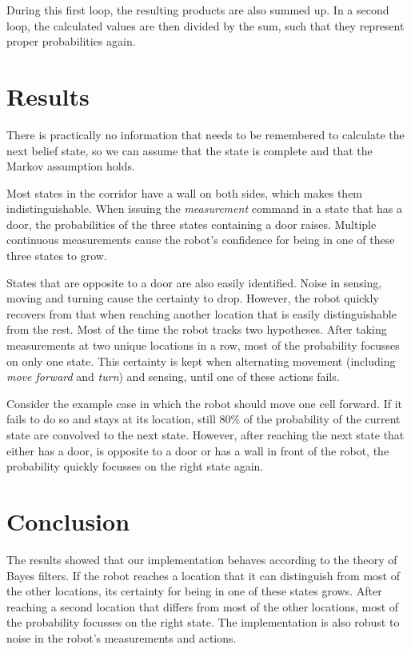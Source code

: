 \documentclass[10pt,a4paper]{article}
\begin{document}
		During this first loop, the resulting products are also summed up. In a second loop, the calculated values are then divided by the sum, such that they represent proper probabilities again.
	
	\section{Results}
	There is practically no information that needs to be remembered to calculate the next belief state, so we can assume that the state is complete and that the Markov assumption holds.
	
	Most states in the corridor have a wall on both sides, which makes them indistinguishable.
	When issuing the \textit{measurement} command in a state that has a door, the probabilities of the three states containing a door raises. Multiple continuous measurements cause the robot's confidence for being in one of these three states to grow.
	
	States that are opposite to a door are also easily identified.
	Noise in sensing, moving and turning cause the certainty to drop. However, the robot quickly recovers from that when reaching another location that is easily distinguishable from the rest.
	Most of the time the robot tracks two hypotheses. After taking measurements at two unique locations in a row, most of the probability focusses on only one state. This certainty is kept when alternating movement (including \textit{move forward} and \textit{turn}) and sensing, until one of these actions fails.
	
	Consider the example case in which the robot should move one cell forward. If it fails to do so and stays at its location, still $80\%$ of the probability of the current state are convolved to the next state. However, after reaching the next state that either has a door, is opposite to a door or has a wall in front of the robot, the probability quickly focusses on the right state again.
	
	\section{Conclusion}
	The results showed that our implementation behaves according to the theory of Bayes filters. If the robot reaches a location that it can distinguish from most of the other locations, its certainty for being in one of these states grows. After reaching a second location that differs from most of the other locations, most of the probability focusses on the right state. The implementation is also robust to noise in the robot's measurements and actions.
	
\end{document}
